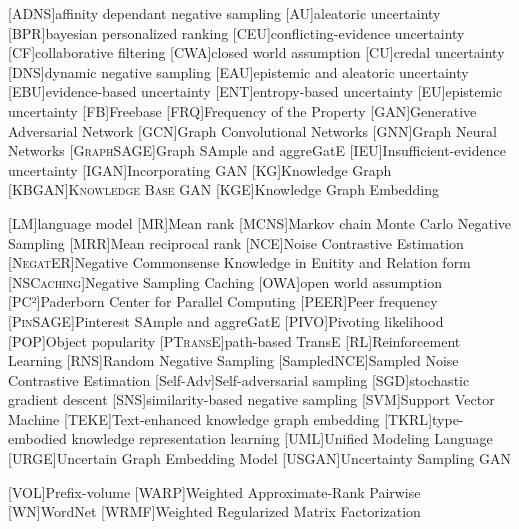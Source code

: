 \begin{acronym}[ECU]
[\textsc{ADNS}]{affinity dependant negative sampling}
[AU]{aleatoric uncertainty}
[BPR]{bayesian personalized ranking}
[CEU]{conflicting-evidence uncertainty}
[CF]{collaborative filtering}
[CWA]{closed world assumption}
[CU]{credal uncertainty}
[DNS]{dynamic negative sampling}
[EAU]{epistemic and aleatoric uncertainty}
[EBU]{evidence-based uncertainty}
[ENT]{entropy-based uncertainty}
[EU]{epistemic uncertainty}
[\textsc{FB}]{Freebase}
[\textsc{FRQ}]{Frequency of the Property}
[GAN]{Generative Adversarial Network}
[GCN]{Graph Convolutional Networks}
[GNN]{Graph Neural Networks}
[\textsc{GraphSAGE}]{Graph SAmple and aggreGatE}
[IEU]{Insufficient-evidence uncertainty}
[\textsc{IGAN}]{Incorporating GAN}
[KG]{Knowledge Graph}
[\textsc{KBGAN}]{\textsc{Knowledge Base GAN}}
[KGE]{Knowledge Graph Embedding}

[LM]{language model}
[MR]{Mean rank}
[\textsc{MCNS}]{Markov chain Monte Carlo Negative Sampling}
[MRR]{Mean reciprocal rank}
[NCE]{Noise Contrastive Estimation}
[\textsc{NegatER}]{Negative Commonsense Knowledge in Enitity and Relation form}
[\textsc{NSCaching}]{Negative Sampling Caching}
[OWA]{open world assumption}
[PC²]{Paderborn Center for Parallel Computing}
[\textsc{PEER}]{Peer frequency}
[\textsc{PinSAGE}]{Pinterest SAmple and aggreGatE}
[\textsc{PIVO}]{Pivoting likelihood}
[\textsc{POP}]{Object popularity}
[\textsc{PTransE}]{path-based TransE}
[RL]{Reinforcement Learning}
[RNS]{Random Negative Sampling}
[SampledNCE]{Sampled Noise Contrastive Estimation}
[Self-Adv]{Self-adversarial sampling}
[SGD]{stochastic gradient descent}
[SNS]{similarity-based negative sampling}
[SVM]{Support Vector Machine}
[\textsc{TEKE}]{Text-enhanced knowledge graph embedding}
[\textsc{TKRL}]{type-embodied knowledge representation learning}
[UML]{Unified Modeling Language}
[\textsc{URGE}]{Uncertain Graph Embedding Model}
[\textsc{USGAN}]{Uncertainty Sampling GAN}

[\textsc{VOL}]{Prefix-volume}
[WARP]{Weighted Approximate-Rank Pairwise}
[\textsc{WN}]{WordNet}
[WRMF]{Weighted Regularized Matrix Factorization}
\end{acronym}